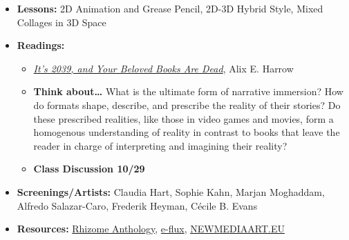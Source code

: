 \def\dMon{3/22}%
\def\dTues{3/23}%
\def\dWed{3/24}%
\def\dThur{3/25}%
\placeDate

\def\tues{10/27}%
\def\thur{10/29}%
% 
\begin{itemize}[noitemsep,topsep=0pt,leftmargin=*]
    \item \textbf{Lessons:} 2D Animation and Grease Pencil, 2D-3D Hybrid Style, Mixed Collages in 3D Space
    \item \textbf{Readings:}
          \begin{itemize}
              \item \href{https://www.nytimes.com/2019/12/02/opinion/future-virtual-reality-stories.html}{\emph{It’s 2039, and Your Beloved Books Are Dead}}, Alix E. Harrow
              \item \textbf{Think about\dots} What is the ultimate form of narrative immersion? How do formats shape, describe, and prescribe the reality of their stories? Do these prescribed realities, like those in video games and movies, form a homogenous understanding of reality in contrast to books that leave the reader in charge of interpreting and imagining their reality?
              \item \textbf{Class Discussion \thur}
          \end{itemize}
    \item \textbf{Screenings/Artists:} Claudia Hart, Sophie Kahn, Marjan Moghaddam, Alfredo Salazar-Caro, Frederik Heyman, Cécile B. Evans
    \item \textbf{Resources:} \href{https://anthology.rhizome.org/}{Rhizome Anthology}, \href{https://www.e-flux.com/journal/}{e-flux}, \href{https://www.newmediaart.eu/}{NEWMEDIAART.EU}
\end{itemize}